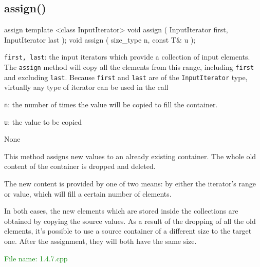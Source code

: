 
\subsection{assign()} %
\begin{methodinfo}
  {assign}
  {template <class InputIterator>
      void assign ( InputIterator first, InputIterator last ); 
      void assign ( size_type n, const T& u );}
  {\texttt{first, last}: the input iterators which provide a collection of input elements. 
  The \texttt{assign} method will copy all the elements from this range, including \texttt{first} and 
  excluding \texttt{last}. Because \texttt{first} and \texttt{last} are of the \texttt{InputIterator} type, 
  virtually any type of iterator can be used in the call

  \texttt{n}: the number of times the value will be copied to fill the container.

  \texttt{u}: the value to be copied}
  {None}
  {This method assigns new values to an already existing container. The whole old content of the 
  container is dropped and deleted.

  The new content is provided by one of two means: by either the iterator’s range or value, 
  which will fill a certain number of elements.

  In both cases, the new elements which are stored inside the collections are obtained by 
  copying the source values. As a result of the dropping of all the old elements, it’s possible 
  to use a source container of a different size to the target one. After the assignment, they will 
  both have the same size.}
\end{methodinfo}

\textcolor{green}{File name: 1.4.7.cpp}

